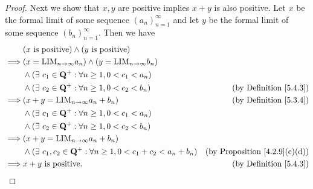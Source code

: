 \begin{proof}
    Next we show that \(x, y\) are positive implies \(x + y\) is also positive.
    Let \(x\) be the formal limit of some sequence \((a_n)_{n = 1}^{\infty}\) and let \(y\) be the formal limit of some sequence \((b_n)_{n = 1}^{\infty}\).
    Then we have
    \begin{align*}
                 & (x \text{ is positive}) \land (y \text{ is positive})                                                                                \\
        \implies & (x = \text{LIM}_{n \to \infty} a_n) \land (y = \text{LIM}_{n \to \infty} b_n)                                                        \\
                 & \land (\exists\ c_1 \in \mathbf{Q}^+ : \forall n \geq 1, 0 < c_1 < a_n)                                                              \\
                 & \land (\exists\ c_2 \in \mathbf{Q}^+ : \forall n \geq 1, 0 < c_2 < b_n)                  & \text{(by Definition \ref{5.4.3})}        \\
        \implies & (x + y = \text{LIM}_{n \to \infty} a_n + b_n)                                            & \text{(by Definition \ref{5.3.4})}        \\
                 & \land (\exists\ c_1 \in \mathbf{Q}^+ : \forall n \geq 1, 0 < c_1 < a_n)                                                              \\
                 & \land (\exists\ c_2 \in \mathbf{Q}^+ : \forall n \geq 1, 0 < c_2 < b_n)                                                              \\
        \implies & (x + y = \text{LIM}_{n \to \infty} a_n + b_n)                                                                                        \\
                 & \land (\exists\ c_1, c_2 \in \mathbf{Q}^+ : \forall n \geq 1, 0 < c_1 + c_2 < a_n + b_n) & \text{(by Proposition \ref{4.2.9}(c)(d))} \\
        \implies & x + y \text{ is positive}.                                                               & \text{(by Definition \ref{5.4.3})}
    \end{align*}


\end{proof}
